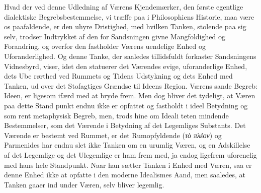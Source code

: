 \documentclass[12pt,a4paper]{book}
\newcommand{\gk}[1]{\textit{#1}}
\begin{document}
Hvad der ved denne Udledning af Værens Kjendemærker,
den første egentlige dialektiske Begrebsbestemmelse, vi træffe
paa i Philosophiens Historie, maa være os paafaldende, er den
%
%
uhyre Dristighed, med hvilken Tanken, stolende paa sig selv,
trodser Indtrykket af den for Sandsningen givne Mangfoldighed
og Forandring, og overfor den fastholder Værens uendelige
Enhed og Uforanderlighed. Og denne Tanke, der saaledes
tillidsfuldt forkaster Sandsningens Vidnesbyrd, viser, idet den
statuerer det Værendes evige, uforanderlige Enhed, dets Ube\-%
rørthed ved Rummets og Tidens Udstykning og dets Enhed
med Tanken, ud over det Stofagtiges Grændse til Ideens Region.
Værens sande Begreb: Ideen, er ligesom ifærd med at bryde
frem. Men dog bliver det tydeligt, at Væren paa dette Stand\-%
punkt endnu ikke er opfattet og fastholdt i ideel Betydning
og som rent metaphysisk Begreb, men, trods hine om Ideali\-%
teten mindende Bestemmelser, som det Værende i Betydning
af det Legemliges Substants. Det Værende er bestemt ved
Rummet, er det Rumopfyldende (\gk{τὸ πλέον}) og Parmenides
har endnu slet ikke Tanken om en urumlig Væren, og en
Adskillelse af det Legemlige og det Ulegemlige er ham frem\-%
med, ja endog ligefrem uforenelig med hans hele Standpunkt.
Naar han sætter Tanken i Enhed med Væren, saa er denne
Enhed ikke at opfatte i den moderne Idealismes Aand, men
saaledes, at Tanken gaaer ind under Væren, selv bliver
legemlig.
\end{document}
